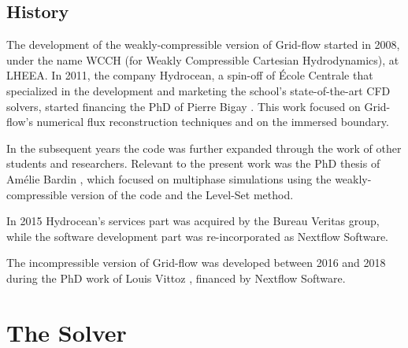 \documentclass[11pt, a4paper, oneside, openany]{book}
\begin{document}
\section{History}\label{Chapter_Introduction_Section_History}
The development of the weakly-compressible version of Grid-flow started in 2008, under the name WCCH (for Weakly Compressible Cartesian Hydrodynamics), at LHEEA. In 2011, the company Hydrocean, a spin-off of École Centrale that specialized in the development and marketing the school's state-of-the-art CFD solvers, started financing the PhD of Pierre Bigay \cite{Bigay2015}. This work focused on Grid-flow's numerical flux reconstruction techniques and on the immersed boundary.\par
In the subsequent years the code was further expanded through the work of other students and researchers. Relevant to the present work was the PhD thesis of Am{\'{e}}lie Bardin \cite{Bardin2015}, which focused on multiphase simulations using the weakly-compressible version of the code and the Level-Set method.\par
In 2015 Hydrocean's services part was acquired by the Bureau Veritas group, while the software development part was re-incorporated as Nextflow Software.\par
The incompressible version of Grid-flow was developed between 2016 and 2018 during the PhD work of Louis Vittoz \cite{Vittoz2018}, financed by Nextflow Software.
\chapter{The Solver}\label{Chapter_Solver}
\end{document}
